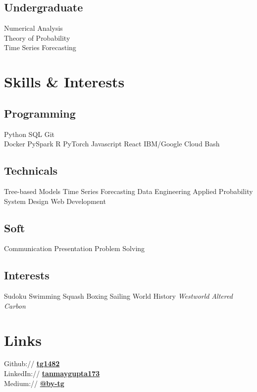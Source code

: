 \documentclass[]{deedy-resume-openfont}
\begin{document}
\begin{minipage}[t]{0.28\textwidth}
\sectionsep

\subsection{Undergraduate}
Numerical Analysis \\
Theory of Probability \\
Time Series Forecasting \\
\sectionsep


\section{Skills \& Interests}
\subsection{Programming}
Python \textbullet{} SQL \textbullet{} Git \\ 
Docker \textbullet{} PySpark \textbullet{} R \textbullet{}
PyTorch \textbullet{} Javascript \textbullet{} React \textbullet{} IBM/Google Cloud \textbullet{} Bash
\sectionsep 

\subsection{Technicals}
Tree-based Models \textbullet{} Time Series Forecasting \textbullet{} Data Engineering \textbullet{} Applied Probability \textbullet{} System Design  \textbullet{} Web Development
\sectionsep

\subsection{Soft}
Communication \textbullet{} Presentation \textbullet{} Problem Solving
\sectionsep

\subsection{Interests}
Sudoku \textbullet{} Swimming \textbullet{} Squash \textbullet{} Boxing \textbullet{} Sailing \textbullet{} World History \textbullet{} \textit{Westworld} \textbullet{} \textit{Altered Carbon}
\sectionsep


\section{Links} 
Github:// \href{https://github.com/tg1482}{\bf tg1482} \\
LinkedIn://  \href{https://www.linkedin.com/in/tanmaygupta173}{\bf tanmaygupta173} \\
Medium:// \href{https://medium.com/@by-tg}{\bf @by-tg} \\


%
%

\end{minipage} 
\end{document}
